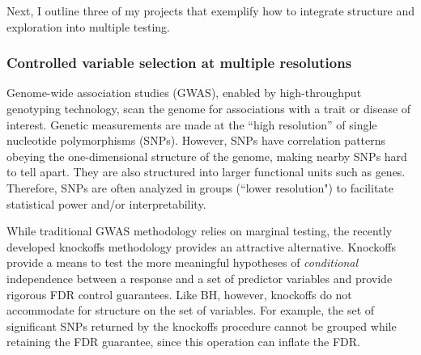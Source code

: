 \documentclass[11pt]{article}
\newcommand{\cR}{\mathcal R}
\begin{document}
Next, I outline three of my projects that exemplify how to integrate structure and exploration into multiple testing.

%

\subsubsection*{Controlled variable selection at multiple resolutions}

Genome-wide association studies (GWAS), enabled by high-throughput genotyping technology, scan the genome for associations with a trait or disease of interest. Genetic measurements are made at the ``high resolution'' of single nucleotide polymorphisms (SNPs). However, SNPs have correlation patterns obeying the one-dimensional structure of the genome, making nearby SNPs hard to tell apart. They are also structured into larger functional units such as genes. Therefore, SNPs are often analyzed in groups (``lower resolution") to facilitate statistical power and/or interpretability.

While traditional GWAS methodology relies on marginal testing, the recently developed knockoffs methodology \cite{knockoffs} provides an attractive alternative. Knockoffs provide a means to test the more meaningful hypotheses of \textit{conditional} independence between a response and a set of predictor variables and provide rigorous FDR control guarantees. Like BH, however, knockoffs do not accommodate for structure on the set of variables. For example, the set of significant SNPs returned by the knockoffs procedure cannot be grouped while retaining the FDR guarantee, since this operation can inflate the FDR. 
\end{document}
